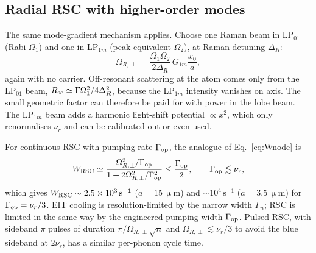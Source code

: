 \documentclass[11pt,a4paper]{article}
\newcommand{\micrometre}{\upmu m}\newcommand{\microkelvin}{\upmu K}
\newcommand{\SI}[2]{\ensuremath{#1\,\mathrm{#2}}}
\newcommand{\Om}{\Omega}
\begin{document}
\subsection{Radial RSC with higher-order modes}
The same mode-gradient mechanism applies. Choose one Raman beam in LP$_{01}$ (Rabi $\Om_1$) and one in LP$_{1m}$ (peak-equivalent $\Om_2$), at Raman detuning $\Delta_R$:
\begin{equation}
  \Om_{R,\perp}=\frac{\Om_1\Om_2}{2\Delta_R}\,G_{1m}\frac{x_0}{a},
\end{equation}
again with no carrier. Off-resonant scattering at the atom comes only from the LP$_{01}$ beam, $R_{\rm sc}\simeq\Gamma\Om_1^2/4\Delta_R^2$, because the LP$_{1m}$ intensity vanishes on axis. The small geometric factor can therefore be paid for with power in the lobe beam. The LP$_{1m}$ beam adds a harmonic light-shift potential $\propto x^2$, which only renormalises $\nu_r$ and can be calibrated out or even used.

For continuous RSC with pumping rate $\Gamma_{\rm op}$, the analogue of Eq.~\eqref{eq:Wnode} is
\begin{equation}
  W_{\rm RSC}\simeq\frac{\Om_{R,\perp}^2/\Gamma_{\rm op}}{1+2\Om_{R,\perp}^2/\Gamma_{\rm op}^2}\le\frac{\Gamma_{\rm op}}2,\qquad\Gamma_{\rm op}\lesssim\nu_r,
\end{equation}
which gives $W_{\rm RSC}\sim\SI{2.5\times10^{3}}{s^{-1}}$ ($a=\SI{15}{\micrometre}$) and $\sim\SI{10^{4}}{s^{-1}}$ ($a=\SI{3.5}{\micrometre}$) for $\Gamma_{\rm op}=\nu_r/3$. EIT cooling is resolution-limited by the narrow width $\Gamma_n$; RSC is limited in the same way by the engineered pumping width $\Gamma_{\rm op}$. Pulsed RSC, with sideband $\pi$ pulses of duration $\pi/\Om_{R,\perp}\sqrt n$ and $\Om_{R,\perp}\lesssim\nu_r/3$ to avoid the blue sideband at $2\nu_r$, has a similar per-phonon cycle time.
\end{document}
